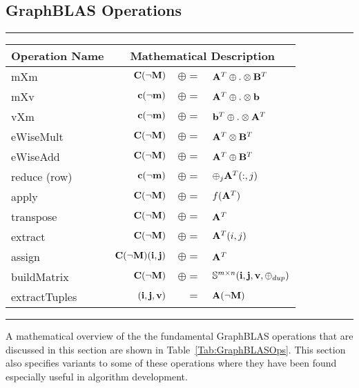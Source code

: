 \subsection{GraphBLAS Operations}
\label{Sec:Operations}

\begin{table*}[h]
\hrule
\begin{center}
\caption{A Mathematical overview of the fundamental GraphBLAS operations supported.}
\label{Tab:GraphBLASOps}
\begin{tabular}{l|rrl}
{\sf Operation Name} & \multicolumn{3}{c}{Mathematical Description}  \\
\hline
{\sf mXm}          & ${\bf C}(\neg{\bf M})$ & $\oplus=$ & ${\bf A}^T \oplus.\otimes {\bf B}^T$  \\
{\sf mXv}          & ${\bf c}(\neg{\bf m})$ & $\oplus=$ & ${\bf A}^T \oplus.\otimes {\bf b}$  \\
{\sf vXm}          & ${\bf c}(\neg{\bf m})$ & $\oplus=$ & ${\bf b}^T \oplus.\otimes {\bf A}^T$  \\
{\sf eWiseMult}    & ${\bf C}(\neg{\bf M})$ & $\oplus=$ & ${\bf A}^T \otimes {\bf B}^T$  \\
{\sf eWiseAdd}     & ${\bf C}(\neg{\bf M})$ & $\oplus=$ & ${\bf A}^T \oplus  {\bf B}^T$  \\
{\sf reduce} (row) & ${\bf c}(\neg{\bf m})$ & $\oplus=$ & $\oplus_j{\bf A}^T(:,j)$  \\
{\sf apply}        & ${\bf C}(\neg{\bf M})$ & $\oplus=$ & $f({\bf A}^T)$ \\
{\sf transpose}    & ${\bf C}(\neg{\bf M})$ & $\oplus=$ & ${\bf A}^T$ \\
{\sf extract}      & ${\bf C}(\neg{\bf M})$ & $\oplus=$ & ${\bf A}^T(i,j)$ \\
{\sf assign}       & ${\bf C}(\neg{\bf M})({\bf i},{\bf j})$ & $\oplus=$ & ${\bf A}^T$ \\
{\sf buildMatrix}  & ${\bf C}(\neg{\bf M})$ & $\oplus=$ & $\mathbb{S}^{m\times n}({\bf i},{\bf j},{\bf v},\oplus_{dup})$ \\
{\sf extractTuples}& $({\bf i},{\bf j},{\bf v})$ & $=$ & ${\bf A}(\neg{\bf M})$ \\
\end{tabular}
\end{center}
\hrule
\end{table*}


A mathematical overview of the the fundamental GraphBLAS operations that are
discussed in this section are shown in Table~\ref{Tab:GraphBLASOps}.  This
section also specifies variants to some of these operations where they have
been found especially useful in algorithm development.

